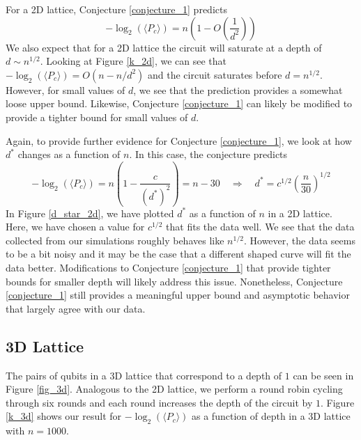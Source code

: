 \documentclass[11pt]{article}
\theoremstyle{definition}
\theoremstyle{plain}
\begin{document}
For a 2D lattice, Conjecture {\ref{conjecture_1}} predicts 
\begin{equation}
-\log_2(\langle P_c \rangle) = n \left( 1 - O\left(\frac{1}{d^2} \right) \right) 
\end{equation}
We also expect that for a 2D lattice the circuit will saturate at a depth of $d \sim n^{1/2}$. Looking at Figure {\ref{k_2d}}, we can see that $-\log_2(\langle P_c \rangle) = O(n - n/d^2)$ and the circuit saturates before $d = n^{1/2}$. However, for small values of $d$, we see that the prediction provides a somewhat loose upper bound. Likewise, Conjecture {\ref{conjecture_1}} can likely be modified to provide a tighter bound for small values of $d$. 

Again, to provide further evidence for Conjecture {\ref{conjecture_1}}, we look at how $d^*$ changes as a function of $n$. In this case, the conjecture predicts
\begin{equation}
  -\log_2(\langle P_c \rangle) = n \left( 1 - \frac{c}{{(d^*)}^2} \right) = n - 30
  \quad \Rightarrow \quad
  d^* = c^{1/2} {\left( \frac{n}{30} \right)}^{1/2}
\end{equation}
In Figure {\ref{d_star_2d}}, we have plotted $d^*$ as a function of $n$ in a 2D lattice. Here, we have chosen a value for $c^{1/2}$ that fits the data well. We see that the data collected from our simulations roughly behaves like $n^{1/2}$. However, the data seems to be a bit noisy and it may be the case that a different shaped curve will fit the data better. Modifications to Conjecture {\ref{conjecture_1}} that provide tighter bounds for smaller depth will likely address this issue. Nonetheless, Conjecture {\ref{conjecture_1}} still provides a meaningful upper bound and asymptotic behavior that largely agree with our data. 

\subsection{3D Lattice}
The pairs of qubits in a 3D lattice that correspond to a depth of $1$ can be seen in Figure {\ref{fig_3d}}. Analogous to the 2D lattice, we perform a round robin cycling through six rounds and each round increases the depth of the circuit by $1$. Figure {\ref{k_3d}} shows our result for $-\log_2(\langle P_c \rangle)$ as a function of depth in a 3D lattice with $n = 1000$. 
\end{document}

